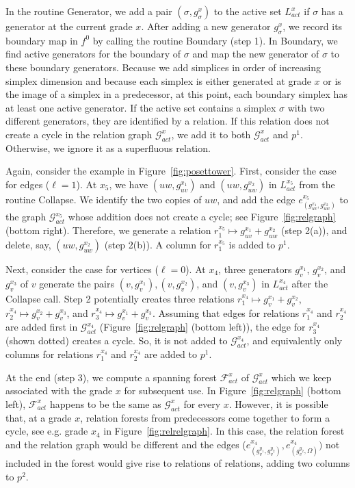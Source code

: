 \documentclass[english,a4paper,nolineno,cleveref]{socg-lipics-v2021}
\newcommand{\G}{\mathcal G}
\newcommand{\F}{\mathcal F}
\begin{document}
In the routine {\sc Generator}, we add a pair $(\sigma, g_\sigma^x)$ to the active set
$L_{act}^{x}$ if $\sigma$ has a generator at the current grade $x$. 
After adding a new generator $g_\sigma^x$, we record its boundary map in $f^0$ by calling the routine {\sc Boundary} (step 1). In {\sc Boundary}, we find active generators for the boundary of $\sigma$ and map the new generator of $\sigma$ to these boundary generators. Because we add simplices in order of increasing simplex dimension and because each simplex is either generated at grade $x$ or is the image of a simplex in a predecessor, at this point, each boundary simplex has at least one active generator.
If the active set contains a simplex $\sigma$ with two different generators, they are
identified by a relation. If this relation does not
create a cycle in the relation graph $\G_{act}^{x}$, we add it to both
$\G_{act}^{x}$ and $p^1$. Otherwise, we ignore it as a superfluous relation.

Again, consider the example in Figure~\ref{fig:posettower}. First, consider
the case for edges ($\ell=1$). At $x_5$, we have $(uw,g_{uv}^{x_1})$ and
$(uw,g_{uw}^{x_2})$ in $L_{act}^{x_5}$ from the routine {\sc Collapse}.
We identify the two copies of $uw$, and add the edge $e^{x_5}_{(g_{uv}^{x_1}, g_{uw}^{x_2})}$
to the graph $\G^{x_5}_{act}$ whose addition does not create a cycle; see Figure~\ref{fig:relgraph} (bottom right). Therefore, we
generate a relation $r_1^{x_5}\mapsto g_{uv}^{x_1}+g_{uw}^{x_2}$ (step 2(a)), and delete, say, $(uw,g_{uw}^{x_2})$
(step 2(b)). A column for $r_1^{x_5}$ is added to $p^1$.

Next, consider the case for vertices ($\ell=0$). At $x_4$, three
generators $g_v^{x_1}$, $g_v^{x_2}$, and $g_v^{x_3}$ of $v$ generate the pairs
$(v,g_v^{x_1}), (v,g_v^{x_2})$, and $(v,g_v^{x_3})$ in $L_{act}^{x_4}$ after the
{\sc Collapse} call. Step 2 potentially creates three relations $r_1^{x_4}\mapsto g_v^{x_1}+g_v^{x_2}$, $r_2^{x_4}\mapsto g_v^{x_2}+g_v^{x_3}$, and
$r_3^{x_4}\mapsto g_v^{x_1}+g_v^{x_3}$. Assuming that edges for relations
$r_1^{x_4}$ and $r_2^{x_4}$ are added first in $\G_{act}^{x_4}$ (Figure~\ref{fig:relgraph} (bottom left)), the edge for $r_3^{x_4}$ (shown dotted) creates a cycle. So, it is not added to $\G^{x_4}_{act}$, and equivalently
only columns for relations $r_1^{x_4}$ and $r_2^{x_4}$ are added to $p^1$.

At the end (step 3), we compute a spanning forest $\F_{act}^{x}$ of $\G_{act}^{x}$
which we keep associated with the grade $x$ for subsequent use. 
In Figure~\ref{fig:relgraph} (bottom left), $\F^{x}_{act}$ happens to be the
same as $\G^{x}_{act}$ for every $x$. However, it is possible that, at a grade $x$, relation forests from predecessors come together to form a cycle, see e.g. grade $x_4$ in Figure~\ref{fig:relrelgraph}. In this case, the relation forest and the
relation graph would be different and the edges ($e^{x_4}_{(g_v^{y_1},g_v^{y_2})},
e^{x_4}_{(g_v^{y_2},\Omega)})$ not included in the forest
would give rise to relations of relations, adding two columns to $p^2$.
\end{document}
